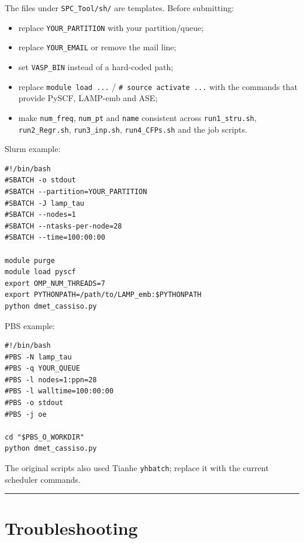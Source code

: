 \documentclass[11pt,a4paper]{article}
\providecommand{\tightlist}{%
  \setlength{\itemsep}{0pt}\setlength{\parskip}{0pt}}
\begin{document}
The files under \texttt{SPC\_Tool/sh/} are templates. Before submitting:

\begin{itemize}
\tightlist
\item
  replace \texttt{YOUR\_PARTITION} with your partition/queue;
\item
  replace \texttt{YOUR\_EMAIL} or remove the mail line;
\item
  set \texttt{VASP\_BIN} instead of a hard-coded path;
\item
  replace \texttt{module\ load\ ...} /
  \texttt{\#\ source\ activate\ ...} with the commands that provide
  PySCF, LAMP-emb and ASE;
\item
  make \texttt{num\_freq}, \texttt{num\_pt} and \texttt{name} consistent
  across \texttt{run1\_stru.sh}, \texttt{run2\_Regr.sh},
  \texttt{run3\_inp.sh}, \texttt{run4\_CFPs.sh} and the job scripts.
\end{itemize}

Slurm example:

\begin{lstlisting}
#!/bin/bash
#SBATCH -o stdout
#SBATCH --partition=YOUR_PARTITION
#SBATCH -J lamp_tau
#SBATCH --nodes=1
#SBATCH --ntasks-per-node=28
#SBATCH --time=100:00:00

module purge
module load pyscf
export OMP_NUM_THREADS=7
export PYTHONPATH=/path/to/LAMP_emb:$PYTHONPATH
python dmet_cassiso.py
\end{lstlisting}

PBS example:

\begin{lstlisting}
#!/bin/bash
#PBS -N lamp_tau
#PBS -q YOUR_QUEUE
#PBS -l nodes=1:ppn=28
#PBS -l walltime=100:00:00
#PBS -o stdout
#PBS -j oe

cd "$PBS_O_WORKDIR"
python dmet_cassiso.py
\end{lstlisting}

The original scripts also used Tianhe \texttt{yhbatch}; replace it with
the current scheduler commands.

\begin{center}\rule{0.5\linewidth}{0.4pt}\end{center}

\section{Troubleshooting}\label{troubleshooting}
\end{document}
